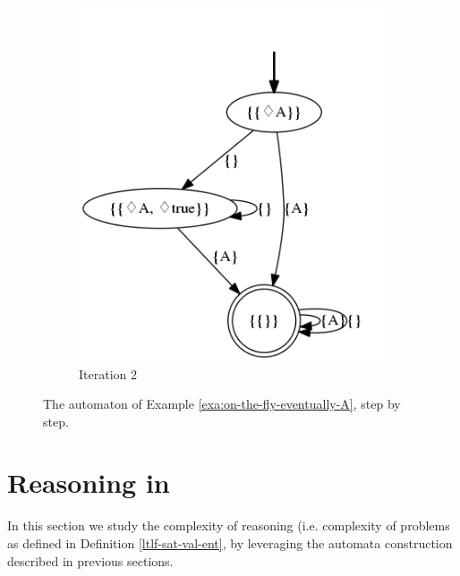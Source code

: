 \begin{example}
\begin{figure}[h]
		\begin{subfigure}[b]{0.5\textwidth}
			\includegraphics[width=\textwidth]{images/on-the-fly-eventually-A-it-complete}
			\caption{Iteration 2}
			\label{fig:exa-on-the-fly-eventually-A-it-complete}
		\end{subfigure}
		\caption{The automaton of Example \ref{exa:on-the-fly-eventually-A}, step by step.}\label{fig:exa-on-the-fly-eventually-A}
	\end{figure}
	
	
\end{example}


\section{Reasoning in \LLf}
In this section we study the complexity of \LLf reasoning (i.e. complexity of problems as defined in Definition \ref{ltlf-sat-val-ent}, by leveraging the automata construction described in previous sections.

